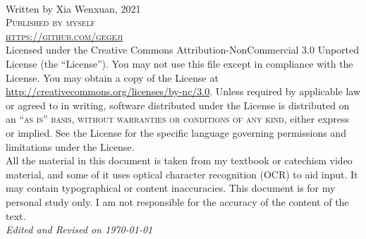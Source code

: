 \documentclass[11pt,fleqn, twoside, openany]{book} %
\begin{document}




\newpage
~\vfill
\thispagestyle{empty}

\noindent Written by Xia Wenxuan, 2021\\

\noindent \textsc{Published by myself}\\ %

\noindent \textsc{\url{https://github.com/gegeji}}\\ %

\noindent Licensed under the Creative Commons Attribution-NonCommercial 3.0 Unported License (the ``License''). You may not use this file except in compliance with the License. You may obtain a copy of the License at \url{http://creativecommons.org/licenses/by-nc/3.0}. Unless required by applicable law or agreed to in writing, software distributed under the License is distributed on an \textsc{``as is'' basis, without warranties or conditions of any kind}, either express or implied. See the License for the specific language governing permissions and limitations under the License.\\ %

\noindent All the material in this document is taken from my textbook or catechism video material, and some of it uses optical character recognition (OCR) to aid input. It may contain typographical or content inaccuracies. This document is for my personal study only. I am not responsible for the accuracy of the content of the text.\\

\noindent \textit{Edited and Revised on \today} %

\end{document}
